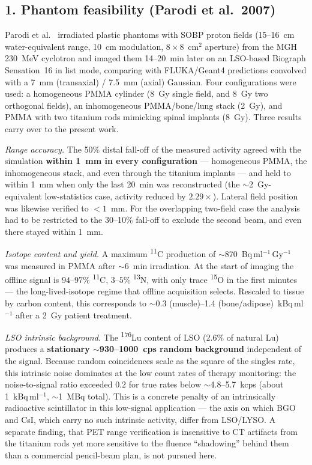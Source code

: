 \documentclass[11pt]{article}
\newcommand{\iso}[2]{\textsuperscript{#1}#2}
\begin{document}
\subsection*{1. Phantom feasibility (Parodi et al.\ 2007)}

Parodi et al.~\cite{parodi2007a} irradiated plastic phantoms with SOBP proton
fields (15--16~cm water-equivalent range, 10~cm modulation, $8\times8$~cm$^2$
aperture) from the MGH 230~MeV cyclotron and imaged them 14--20~min later on an
LSO-based Biograph Sensation~16 in list mode, comparing with FLUKA/Geant4
predictions convolved with a 7~mm (transaxial) / 7.5~mm (axial) Gaussian. Four
configurations were used: a homogeneous PMMA cylinder (8~Gy single field, and
8~Gy two orthogonal fields), an inhomogeneous PMMA/bone/lung stack (2~Gy), and
PMMA with two titanium rods mimicking spinal implants (8~Gy). Three results
carry over to the present work.

\emph{Range accuracy.} The 50\% distal fall-off of the measured activity agreed
with the simulation \textbf{within 1~mm in every configuration} --- homogeneous
PMMA, the inhomogeneous stack, and even through the titanium implants --- and
held to within 1~mm when only the last 20~min was reconstructed (the
$\sim$2~Gy-equivalent low-statistics case, activity reduced by $2.29\times$).
Lateral field position was likewise verified to $<1$~mm. For the overlapping
two-field case the analysis had to be restricted to the 30--10\% fall-off to
exclude the second beam, and even there stayed within 1~mm.

\emph{Isotope content and yield.} A maximum \iso{11}{C} production of
$\sim$870~Bq\,ml$^{-1}$\,Gy$^{-1}$ was measured in PMMA after $\sim$6~min
irradiation. At the start of imaging the offline signal is $94$--$97\%$
\iso{11}{C}, $3$--$5\%$ \iso{13}{N}, with only trace \iso{15}{O} in the first
minutes --- the long-lived-isotope regime that offline acquisition selects.
Rescaled to tissue by carbon content, this corresponds to $\sim$0.3
(muscle)--1.4 (bone/adipose)~kBq\,ml$^{-1}$ after a 2~Gy patient treatment.

\emph{LSO intrinsic background.} The \iso{176}{Lu} content of LSO (2.6\% of
natural Lu) produces a \textbf{stationary $\sim$930--1000~cps random background}
independent of the signal. Because random coincidences scale as the square of the
singles rate, this intrinsic noise dominates at the low count rates of therapy
monitoring: the noise-to-signal ratio exceeded $0.2$ for true rates below
$\sim$4.8--5.7~kcps (about 1~kBq\,ml$^{-1}$, $\sim$1~MBq total). This is a
concrete penalty of an intrinsically radioactive scintillator in this
low-signal application --- the axis on which BGO and CsI, which carry no such
intrinsic activity, differ from LSO/LYSO. A separate finding, that PET range
verification is insensitive to CT artifacts from the titanium rods yet more
sensitive to the fluence ``shadowing'' behind them than a commercial pencil-beam
plan, is not pursued here.
\end{document}

